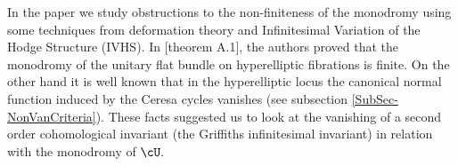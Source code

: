 \documentclass[a4paper,11pt]{amsart}
\begin{document}
 In the paper we study obstructions to the non-finiteness of the monodromy using some techniques from deformation theory and Infinitesimal Variation of the Hodge Structure (IVHS). 
  In \cite{LuZuo_OnTheSlope_2017}[theorem A.1], the authors proved that the monodromy of the unitary flat bundle on hyperelliptic fibrations is finite. On the other hand it is well known that in the hyperelliptic locus the canonical normal function induced by the Ceresa cycles vanishes (see subsection \ref{SubSec-NonVanCriteria}). These facts suggested us to look at the vanishing of a second order cohomological invariant (the Griffiths infinitesimal invariant) in relation with the monodromy of $\cU.$
\end{document}
